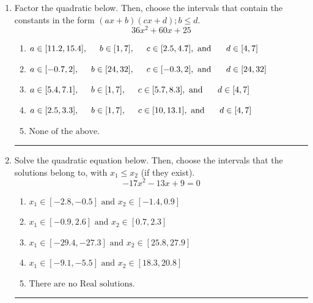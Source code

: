 \documentclass[14pt]{extbook}
\newcommand{\litem}[1]{\item#1\hspace*{-1cm}\rule{\textwidth}{0.4pt}}
\begin{document}
\begin{enumerate}
{\begin{enumerate}[label=\Alph*.]
\end{enumerate} }
\litem{
Factor the quadratic below. Then, choose the intervals that contain the constants in the form $(ax+b)(cx+d); b \leq d.$\[ 36x^{2} +60 x + 25 \]\begin{enumerate}[label=\Alph*.]
\item \( a \in [11.2, 15.4], \hspace*{5mm} b \in [1, 7], \hspace*{5mm} c \in [2.5, 4.7], \text{ and } \hspace*{5mm} d \in [4, 7] \)
\item \( a \in [-0.7, 2], \hspace*{5mm} b \in [24, 32], \hspace*{5mm} c \in [-0.3, 2], \text{ and } \hspace*{5mm} d \in [24, 32] \)
\item \( a \in [5.4, 7.1], \hspace*{5mm} b \in [1, 7], \hspace*{5mm} c \in [5.7, 8.3], \text{ and } \hspace*{5mm} d \in [4, 7] \)
\item \( a \in [2.5, 3.3], \hspace*{5mm} b \in [1, 7], \hspace*{5mm} c \in [10, 13.1], \text{ and } \hspace*{5mm} d \in [4, 7] \)
\item \( \text{None of the above.} \)

\end{enumerate} }
\litem{
Solve the quadratic equation below. Then, choose the intervals that the solutions belong to, with $x_1 \leq x_2$ (if they exist).\[ -17x^{2} -13 x + 9 = 0 \]\begin{enumerate}[label=\Alph*.]
\item \( x_1 \in [-2.8, -0.5] \text{ and } x_2 \in [-1.4, 0.9] \)
\item \( x_1 \in [-0.9, 2.6] \text{ and } x_2 \in [0.7, 2.3] \)
\item \( x_1 \in [-29.4, -27.3] \text{ and } x_2 \in [25.8, 27.9] \)
\item \( x_1 \in [-9.1, -5.5] \text{ and } x_2 \in [18.3, 20.8] \)
\item \( \text{There are no Real solutions.} \)


\end{enumerate}}
\end{enumerate}
\end{document}

